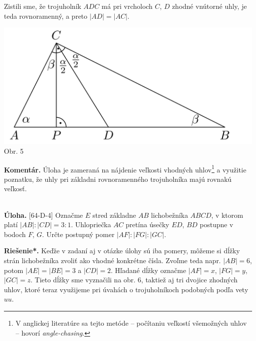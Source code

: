 \documentclass[11pt,a4paper,oneside,final]{book}
\newcommand{\kom}{\textbf{Komentár.} }
\newcommand{\ul}{\textbf{Úloha.} }
\newcommand{\rieh}{\textbf{Riešenie*.} }
\begin{document}
Zistili sme, že trojuholník $ADC$ má pri vrcholoch $C$, $D$ zhodné vnútorné uhly, je
teda rovnoramenný, a preto $|AD| = |AC|$.
\begin{center}
\includegraphics[scale=0.3]{58S2}\\

Obr. 5
\end{center}
\kom Úloha je zameraná na nájdenie veľkosti vhodných uhlov\footnote{V anglickej literatúre sa tejto metóde -- počítaniu veľkostí všemožných uhlov -- hovorí \textit{angle-chasing}.} a využitie poznatku, že uhly pri základni rovnoramenného trojuholníka majú rovnakú veľkosť.\\
\\
\begin{tcolorbox}[breakable,notitle,boxrule=0pt,colback=light-gray,colframe=light-gray]\ul [64-D-4] Označme $E$ stred základne $AB$ lichobežníka $ABCD$, v ktorom platí $|AB| : |CD| = 3 : 1$. Uhlopriečka $AC$ pretína úsečky $ED$, $BD$ postupne v bodoch $F$, $G$. Určte postupný pomer $|AF| : |FG| : |GC|$.

\end{tcolorbox}

\rieh  Keďže v zadaní aj v otázke úlohy sú iba pomery, môžeme si dĺžky strán lichobežníka zvoliť ako vhodné konkrétne čísla. Zvoľme teda napr. $|AB| = 6$, potom $|AE| = |BE| = 3$ a $|CD| = 2$. Hľadané dĺžky označme $|AF| = x$, $|FG| = y$, $|GC| = z$. Tieto dĺžky sme vyznačili na obr. 6, taktiež aj tri dvojice zhodných uhlov, ktoré teraz využijeme pri úvahách o trojuholníkoch podobných podľa vety $uu$.
\end{document}
